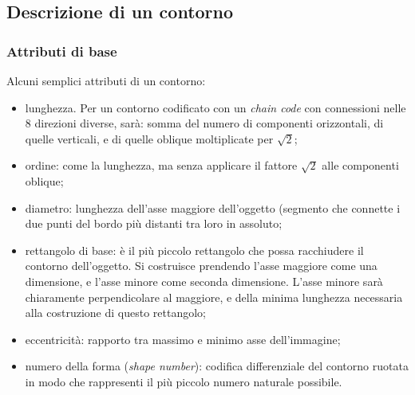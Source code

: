 \documentclass[a4paper,11pt]{article}
\begin{document}
\subsection{Descrizione di un contorno}
\subsubsection{Attributi di base}
Alcuni semplici attributi di un contorno:
\begin{itemize}
    \item lunghezza. Per un contorno codificato con un \textit{chain code} con connessioni nelle 8 direzioni diverse, sarà: somma del numero di componenti orizzontali, di quelle verticali,
    e di quelle oblique moltiplicate per $\sqrt{2}$;
    \item ordine: come la lunghezza, ma senza applicare il fattore $\sqrt{2}$ alle componenti oblique;
    \item diametro: lunghezza dell'asse maggiore dell'oggetto (segmento che connette i due punti del bordo più distanti tra loro in assoluto;
    \item rettangolo di base: è il più piccolo rettangolo che possa racchiudere il contorno dell'oggetto. Si costruisce prendendo l'asse maggiore come una dimensione, e l'asse minore
    come seconda dimensione. L'asse minore sarà chiaramente perpendicolare al maggiore, e della minima lunghezza necessaria alla costruzione di questo rettangolo;
    \item eccentricità: rapporto tra massimo e minimo asse dell'immagine;
    \item numero della forma (\textit{shape number}): codifica differenziale del contorno ruotata in modo che rappresenti il più piccolo numero naturale possibile.
\end{itemize}
\end{document}
